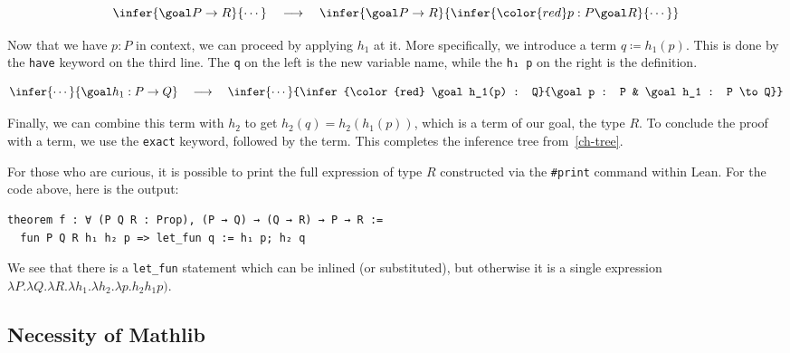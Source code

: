 \[
  \infer{\goal P \to R}{\cdots} \quad \longrightarrow \quad \infer{\goal P \to R}{\infer{\color{red} p : P \goal R}{\cdots}}
\]

Now that we have \(p : P\) in context, we can proceed by applying \(h_1\) at it. More specifically, we introduce a term \(q \coloneqq h_1(p)\). This is done by the \texttt{have} keyword on the third line. The \texttt{q} on the left is the new variable name, while the \texttt{h₁ p} on the right is the definition.

\[
  \infer{\cdots}{\goal h_1 : P \to Q} \quad \longrightarrow \quad \infer{\cdots}{\infer{\color{red} \goal h_1(p) : Q}{\goal p : P & \goal h_1 : P \to Q}}
\]

Finally, we can combine this term with \(h_2\) to get \(h_2(q) = h_2(h_1(p))\), which is a term of our goal, the type \(R\). To conclude the proof with a term, we use the \texttt{exact} keyword, followed by the term. This completes the inference tree from~\ref{ch-tree}.

For those who are curious, it is possible to print the full expression of type \(R\) constructed via the \texttt{#print} command within Lean. For the code above, here is the output:

\begin{verbatim}
theorem f : ∀ (P Q R : Prop), (P → Q) → (Q → R) → P → R :=
  fun P Q R h₁ h₂ p => let_fun q := h₁ p; h₂ q
\end{verbatim}

We see that there is a \texttt{let_fun} statement which can be inlined (or substituted), but otherwise it is a single expression \(\lambda P. \lambda Q. \lambda R. \lambda h_1. \lambda h_2. \lambda p. h_2h_1p)\).

\subsection{Necessity of Mathlib}
